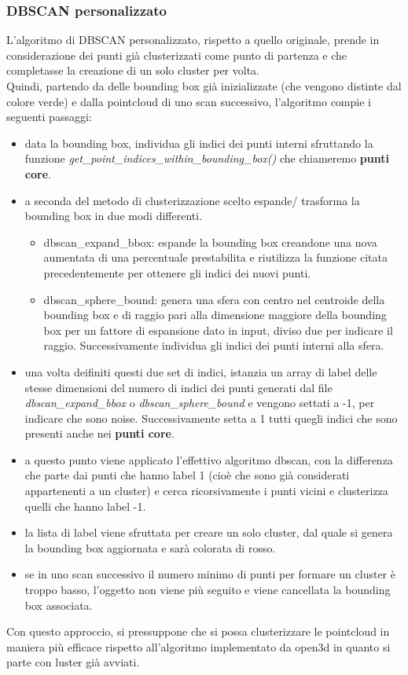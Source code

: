 \documentclass[italian]{article}
\begin{document}
\subsubsection{DBSCAN personalizzato}
L'algoritmo di DBSCAN personalizzato, rispetto a quello originale, prende in considerazione dei punti già clusterizzati come punto di partenza e che completasse la creazione di un solo cluster per volta.\\
Quindi, partendo da delle bounding box già inizializzate (che vengono distinte dal colore verde) e dalla pointcloud di uno scan successivo, l'algoritmo compie i seguenti passaggi:
\begin{itemize}
	\item data la bounding box, individua gli indici dei punti interni sfruttando la funzione \textit{get\_point\_indices\_within\_bounding\_box()} che chiameremo \textbf{punti core}.
	\item a seconda del metodo di clusterizzazione scelto espande/ trasforma la bounding box in due modi differenti.
		\begin{itemize}
			\item dbscan\_expand\_bbox: espande la bounding box creandone una nova aumentata di una percentuale prestabilita e riutilizza la funzione citata precedentemente per ottenere gli indici dei nuovi punti.
			\item dbscan\_sphere\_bound: genera una sfera con centro nel centroide della bounding box e di raggio pari alla dimensione maggiore della bounding box per un fattore di espansione dato in input, diviso due 					per indicare il raggio. Successivamente individua gli indici dei punti interni alla sfera.
		\end{itemize}
	\item una volta deifiniti questi due set di indici, istanzia un array di label delle stesse dimensioni del numero di indici dei punti generati dal file \textit{dbscan\_expand\_bbox} o \textit{dbscan\_sphere\_bound} e vengono settati a -1, per indicare che sono noise. Successivamente setta a 1 tutti quegli indici che sono presenti anche nei \textbf{punti core}.
	\item a questo punto viene applicato l'effettivo algoritmo dbscan, con la differenza che parte dai punti che hanno label 1 (cioè che sono già considerati appartenenti a un cluster) e cerca ricorsivamente i punti vicini e clusterizza quelli che hanno label -1.
	\item la lista di label viene sfruttata per creare un solo cluster, dal quale si genera la bounding box aggiornata e sarà colorata di rosso.
	\item se in uno scan successivo il numero minimo di punti per formare un cluster è troppo basso, l'oggetto non viene più seguito e viene cancellata la bounding box associata.
\end{itemize}
Con questo approccio, si pressuppone che si possa clusterizzare le pointcloud in maniera più efficace rispetto all'algoritmo implementato da open3d in quanto si parte con luster già avviati.\\
\end{document}
